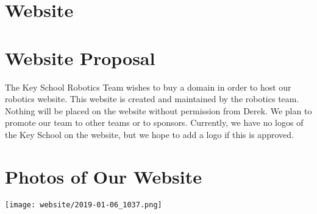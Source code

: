 \documentclass[12pt]{article}
\begin{document}
\newpage
\setcounter{section}{0}
\setcounter{page}{91}










\section*{Website}

\section{Website Proposal}
The Key School Robotics Team wishes to buy a domain in order to host our robotics website. This website is created and maintained by the robotics team. Nothing will be placed on the website without permission from Derek. We plan to promote our team to other teams or to sponsors. Currently, we have no logos of the Key School on the website, but we hope to add a logo if this is approved.

\section{Photos of Our Website}
\texttt{[image: website/2019-01-06\_1037.png]}

\newpage
\setcounter{section}{0}
\setcounter{page}{101}
\end{document}
